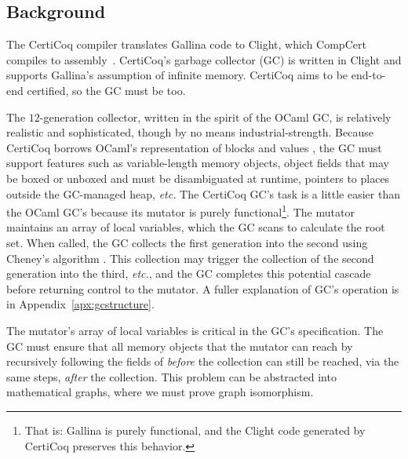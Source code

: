 

\subsection{Background}
\label{sec:gcbackground}

The CertiCoq compiler \cite{certicoqpaper} translates Gallina code to
Clight, which CompCert compiles to assembly~\cite{leroy:compcert}.
CertiCoq's garbage collector (GC) is written in Clight and
supports Gallina's assumption of infinite memory.
CertiCoq aims to be end-to-end certified, so the GC
must be too.

The $12$-generation collector, written in the spirit of the OCaml GC,
is relatively realistic and sophisticated, though by no means
industrial-strength.
Because CertiCoq borrows OCaml's representation of blocks and
values \cite{realworldocaml}, the GC must support features such as
variable-length memory objects, object fields that may be boxed
or unboxed and must be disambiguated at runtime, pointers to places
outside the GC-managed heap, \emph{etc.}
The CertiCoq GC's task is a little easier than the OCaml GC's because
its mutator is purely functional\footnote{That is: Gallina is purely functional, and
the Clight code generated by CertiCoq preserves this behavior.}.
The mutator maintains an  array of
local variables, which the GC scans to
calculate the root set. When called, the GC collects the first generation
into the second using Cheney's algorithm \cite{cheney:gc}.
This collection may trigger the collection of the second generation
into the third, \emph{etc.}, and the GC completes this potential cascade
before returning control to the mutator. A
fuller explanation of GC's operation is in Appendix~\ref{apx:gcstructure}.

The mutator's  array of local variables is critical in the GC's specification.
The GC must ensure that all memory objects that the mutator can reach by recursively
following the fields of  \emph{before} the collection can still be reached,
via the same steps, \emph{after} the collection.  This problem can be abstracted into
mathematical graphs, where we must prove graph isomorphism.

